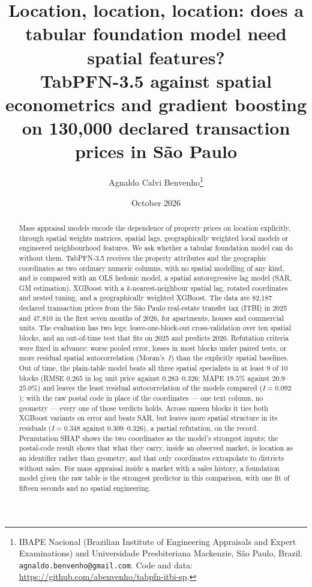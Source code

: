 \documentclass[11pt,a4paper]{article}
\title{Location, location, location: does a tabular foundation model need spatial features?\\
\large TabPFN-3.5 against spatial econometrics and gradient boosting on 130{,}000 declared
transaction prices in São Paulo}
\author{Agnaldo Calvi Benvenho\thanks{IBAPE Nacional (Brazilian Institute of Engineering
Appraisals and Expert Examinations) and Universidade Presbiteriana Mackenzie, São Paulo, Brazil.
\texttt{agnaldo.benvenho@gmail.com}. Code and data:
\url{https://github.com/abenvenho/tabpfn-itbi-sp}.}}
\date{October 2026}
\begin{document}
\maketitle

\begin{abstract}
Mass appraisal models encode the dependence of property prices on location explicitly, through
spatial weights matrices, spatial lags, geographically weighted local models or engineered
neighbourhood features. We ask whether a tabular foundation model can do without them.
TabPFN-3.5 receives the property attributes and the geographic coordinates as two ordinary numeric
columns, with no spatial modelling of any kind, and is compared with an OLS hedonic model, a
spatial autoregressive lag model (SAR, GM estimation), XGBoost with a $k$-nearest-neighbour
spatial lag, rotated coordinates and nested tuning, and a geographically weighted XGBoost. The
data are 82{,}187 declared transaction prices from the São Paulo real-estate transfer tax (ITBI)
in 2025 and 47{,}810 in the first seven months of 2026, for apartments, houses and commercial
units. The evaluation has two legs: leave-one-block-out cross-validation over ten spatial blocks,
and an out-of-time test that fits on 2025 and predicts 2026. Refutation criteria were fixed in
advance: worse pooled error, losses in most blocks under paired tests, or more residual spatial
autocorrelation (Moran's~$I$) than the explicitly spatial baselines. Out of time, the plain-table
model beats all three spatial specialists in at least 9 of 10 blocks (RMSE $0.265$ in log unit
price against $0.283$--$0.326$; MAPE $19.5\%$ against $20.9$--$25.0\%$) and leaves the least
residual autocorrelation of the models compared ($I = 0.092$); with the raw postal code in place
of the coordinates --- one text column, no geometry --- every one of those verdicts holds. Across
unseen blocks it ties both XGBoost variants on error and beats SAR, but leaves more spatial
structure in its residuals ($I = 0.348$ against $0.309$--$0.326$), a partial refutation, on the
record. Permutation SHAP shows the two coordinates as the model's strongest inputs; the
postal-code result shows that what they carry, inside an observed market, is location as an
identifier rather than geometry, and that only coordinates extrapolate to districts without sales.
For mass appraisal inside a market with a sales history, a foundation model given the raw table is
the strongest predictor in this comparison, with one fit of fifteen seconds and no spatial
engineering.
\end{abstract}
\end{document}
